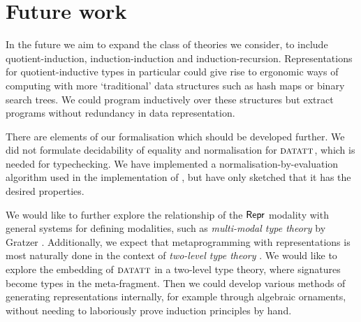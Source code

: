 
\section{Future work}


In the future we aim to expand the class of theories we consider, to include
quotient-induction, induction-induction and induction-recursion. Representations
for quotient-inductive types in particular could give rise to ergonomic ways of
computing with more `traditional' data structures such as hash maps or binary
search trees. We could program inductively over these structures but extract
programs without redundancy in data representation.


There are elements of our formalisation which should be developed further. We
did not formulate decidability of equality and normalisation for ${\textsc{datatt}}$,
which is needed for typechecking. We have implemented a
normalisation-by-evaluation \cite{Altenkirch2020-rm} algorithm used in the
implementation of \superfluid, but have only sketched that it has the
desired properties.

We would like to further explore the relationship of the $\textsf{Repr}$ modality with
general systems for defining modalities, such as \emph{multi-modal type theory}
by Gratzer \cite{Gratzer2020-kf}. Additionally, we expect that metaprogramming with
representations is most naturally done in the context of \emph{two-level type theory}
\cite{Kovacs2022-vb}. We would like to explore the embedding of ${\textsc{datatt}}$
in a two-level type theory, where signatures become types in the meta-fragment.
Then we could develop various methods of generating representations internally,
for example through algebraic ornaments, without needing to laboriously prove
induction principles by hand.

